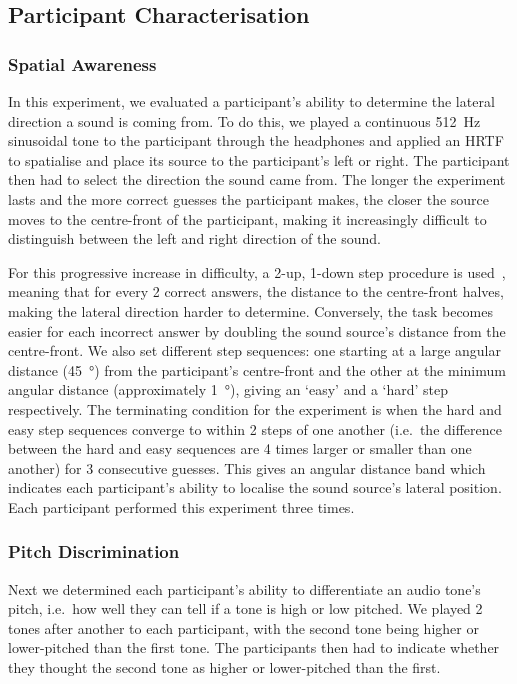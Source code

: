 \documentclass[sigconf, review=true, screen=true, anonymous=true]{acmart}
\begin{document}
\subsection{Participant Characterisation}

\subsubsection{Spatial Awareness}

In this experiment, we evaluated a participant's ability to determine the lateral direction a sound is coming from.
To do this, we played a continuous \SI{512}{\hertz} sinusoidal tone to the participant through the headphones and applied an HRTF to spatialise and place its source to the participant's left or right.
The participant then had to select the direction the sound came from.
The longer the experiment lasts and the more correct guesses the participant makes, the closer the source moves to the centre-front of the participant, making it increasingly difficult to distinguish between the left and right direction of the sound. 

For this progressive increase in difficulty, a 2-up, 1-down step procedure is used~\cite{wetherill1965sequential,levitt1971transformed}, meaning that for every 2 correct answers, the distance to the centre-front halves, making the lateral direction harder to determine.
Conversely, the task becomes easier for each incorrect answer by doubling the sound source's distance from the centre-front.
We also set  different step sequences: one starting at a large angular distance (\SI{45}{\degree}) from the participant's centre-front and the other at the minimum angular distance (approximately \SI{1}{\degree}), giving an `easy' and a `hard' step respectively.
The terminating condition for the experiment is when the hard and easy step sequences converge to within 2 steps of one another (i.e.\ the difference between the hard and easy sequences are 4 times larger or smaller than one another) for 3 consecutive guesses.
This gives an angular distance band which indicates each participant's ability to localise the sound source's lateral position.
Each participant performed this experiment three times. 

\subsubsection{Pitch Discrimination}

Next we determined each participant's ability to differentiate an audio tone's pitch, i.e.\ how well they can tell if a tone is high or low pitched.
We played 2 tones after another to each participant, with the second tone being higher or lower-pitched than the first tone.
The participants then had to indicate whether they thought the second tone as higher or lower-pitched than the first.
\end{document}
